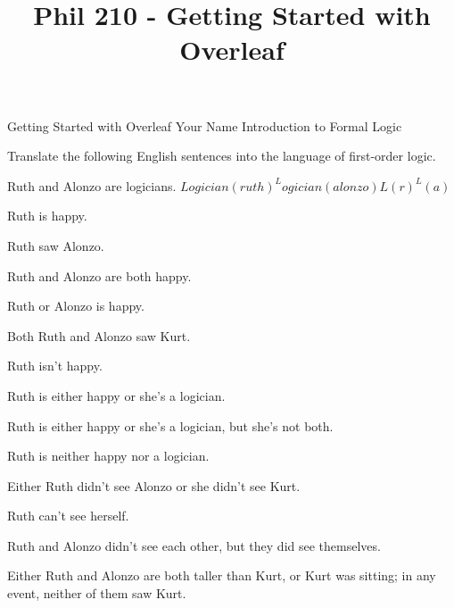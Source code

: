 
\title{Phil 210 - Getting Started with Overleaf}

\heading
Getting Started with Overleaf
Your Name
Introduction to Formal Logic
\endheading

Translate the following English sentences into the language of first-order logic.

\problems
{}
Ruth and Alonzo are logicians.
	\answer
	$ Logician(ruth) ^ Logician(alonzo) $\OR$L(r)^L(a)$
	\endanswer

Ruth is happy.
	\answer
	$ $
	\endanswer

Ruth saw Alonzo.
	\answer
	$ $
	\endanswer

Ruth and Alonzo are both happy.
	\answer
	$ $
	\endanswer

Ruth or Alonzo is happy.
	\answer
	$ $
	\endanswer

Both Ruth and Alonzo saw Kurt.
	\answer
	$ $
	\endanswer

Ruth isn't happy.
	\answer
	$ $
	\endanswer

Ruth is either happy or she's a logician.
	\answer
	$ $
	\endanswer

Ruth is either happy or she's a logician, but she's not both.
	\answer
	$ $
	\endanswer

Ruth is neither happy nor a logician.
	\answer
	$ $
	\endanswer

Either Ruth didn't see Alonzo or she didn't see Kurt.
	\answer
	$ $
	\endanswer

Ruth can't see herself.
	\answer
	$ $
	\endanswer

Ruth and Alonzo didn't see each other, but they did see themselves.
	\answer
	$ $
	\endanswer

Either Ruth and Alonzo are both taller than Kurt, or Kurt was sitting; in any event, neither of them saw Kurt.
	\answer
	$ $
	\endanswer

\endproblems
\bye
